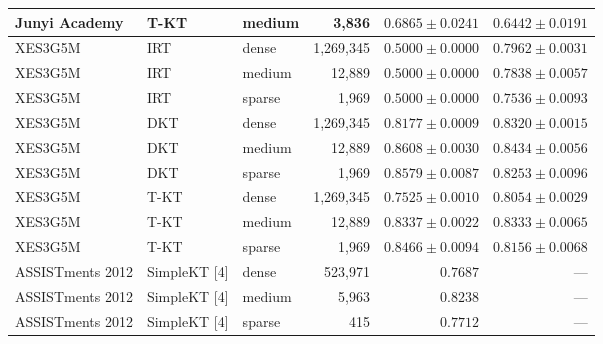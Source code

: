 \begin{table}[htbp]
{\begin{tabular}{lllrrr}
Junyi Academy & T-KT & medium & 3,836 & $0.6865\pm0.0241$ & $0.6442\pm0.0191$ \\
\midrule
XES3G5M & IRT & dense & 1,269,345 & $0.5000\pm0.0000$ & $0.7962\pm0.0031$ \\
XES3G5M & IRT & medium & 12,889 & $0.5000\pm0.0000$ & $0.7838\pm0.0057$ \\
XES3G5M & IRT & sparse & 1,969 & $0.5000\pm0.0000$ & $0.7536\pm0.0093$ \\
XES3G5M & DKT & dense & 1,269,345 & $0.8177\pm0.0009$ & $0.8320\pm0.0015$ \\
XES3G5M & DKT & medium & 12,889 & $0.8608\pm0.0030$ & $0.8434\pm0.0056$ \\
XES3G5M & DKT & sparse & 1,969 & $0.8579\pm0.0087$ & $0.8253\pm0.0096$ \\
XES3G5M & T-KT & dense & 1,269,345 & $0.7525\pm0.0010$ & $0.8054\pm0.0029$ \\
XES3G5M & T-KT & medium & 12,889 & $0.8337\pm0.0022$ & $0.8333\pm0.0065$ \\
XES3G5M & T-KT & sparse & 1,969 & $0.8466\pm0.0094$ & $0.8156\pm0.0068$ \\
\midrule
ASSISTments 2012 & SimpleKT [4] & dense & 523,971 & $0.7687$ & — \\
ASSISTments 2012 & SimpleKT [4] & medium & 5,963 & $0.8238$ & — \\
ASSISTments 2012 & SimpleKT [4] & sparse & 415 & $0.7712$ & — \\
\bottomrule
\end{tabular}%
}
\end{table}
